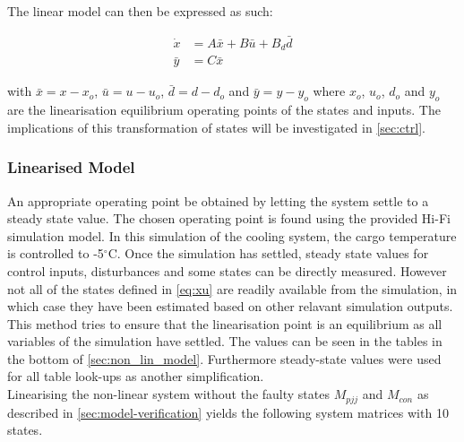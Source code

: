 \noindent The linear model can then be expressed as such:

\begin{equation} \label{eq:state_space_linear}
	\begin{split}
		\dot{x} & = A\bar{x} + B\bar{u} + B_d\bar{d} \\
		\bar{y} & = C\bar{x}
	\end{split}
\end{equation}

with $\bar{x} = x-x_o$, $\bar{u} = u-u_o$, $\bar{d} = d-d_o$ and $\bar{y} = y-y_o$ where $x_o$, $u_o$, $d_o$ and $y_o$ are the linearisation equilibrium operating points of the states and inputs. The implications of this transformation of states will be investigated in \cref{sec:ctrl}.

\subsubsection{Linearised Model} \label{sec:linearised-model}
An appropriate operating point be obtained by letting the system settle to a steady state value. The chosen operating point is found using the provided Hi-Fi simulation model. In this simulation of the cooling system, the cargo temperature is controlled to -5$^{\circ}$C. Once the simulation has settled, steady state values for control inputs, disturbances and some states can be directly measured. However not all of the states defined in \cref{eq:xu} are readily available from the simulation, in which case they have been estimated based on other relavant simulation outputs. This method tries to ensure that the linearisation point is an equilibrium as all variables of the simulation have settled. The values can be seen in the tables in the bottom of  \cref{sec:non_lin_model}. Furthermore steady-state values were used for all table look-ups as another simplification.\\

Linearising the non-linear system without the faulty states $ M_{pjj} $ and $ M_{con} $ as described in \cref{sec:model-verification} yields the following system matrices with 10 states.


